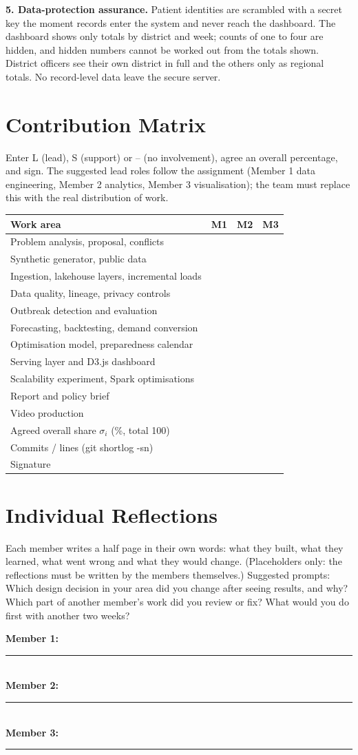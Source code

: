 \documentclass[conference]{IEEEtran}
\begin{document}
\textbf{5. Data-protection assurance.} Patient identities are scrambled with a secret key the moment records enter the system and never reach the dashboard. The dashboard shows only totals by district and week; counts of one to four are hidden, and hidden numbers cannot be worked out from the totals shown. District officers see their own district in full and the others only as regional totals. No record-level data leave the secure server.

\section{Contribution Matrix}\label{app:matrix}
Enter L (lead), S (support) or -- (no involvement), agree an overall percentage, and sign. The suggested lead roles follow the assignment (Member 1 data engineering, Member 2 analytics, Member 3 visualisation); the team must replace this with the real distribution of work.
\begin{table}[h]\centering\footnotesize
\begin{tabularx}{\columnwidth}{@{}Xccc@{}}\toprule Work area & M1 & M2 & M3 \\\midrule
Problem analysis, proposal, conflicts & & & \\
Synthetic generator, public data & & & \\
Ingestion, lakehouse layers, incremental loads & & & \\
Data quality, lineage, privacy controls & & & \\
Outbreak detection and evaluation & & & \\
Forecasting, backtesting, demand conversion & & & \\
Optimisation model, preparedness calendar & & & \\
Serving layer and D3.js dashboard & & & \\
Scalability experiment, Spark optimisations & & & \\
Report and policy brief & & & \\
Video production & & & \\\midrule
Agreed overall share $\sigma_i$ (\%, total 100) & & & \\
Commits / lines (git shortlog -sn) & & & \\
Signature & & & \\\bottomrule
\end{tabularx}\end{table}

\section{Individual Reflections}\label{app:reflect}
Each member writes a half page in their own words: what they built, what they learned, what went wrong and what they would change. (Placeholders only: the reflections must be written by the members themselves.) Suggested prompts: Which design decision in your area did you change after seeing results, and why? Which part of another member's work did you review or fix? What would you do first with another two weeks?

\vspace{4pt}\noindent\textbf{Member 1:} \rule{0.9\columnwidth}{0.4pt}\\[10pt]
\noindent\textbf{Member 2:} \rule{0.9\columnwidth}{0.4pt}\\[10pt]
\noindent\textbf{Member 3:} \rule{0.9\columnwidth}{0.4pt}
\end{document}
